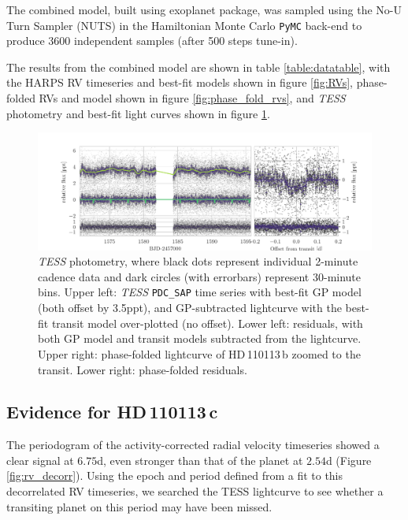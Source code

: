 \documentclass[fleqn,usenatbib]{mnras}
\newcommand{\tess}{{\it TESS}}
\newcommand{\harps}{{HARPS}}
\newcommand{\Tplanet}{HD\,110113\,b}
\newcommand{\Tplanetc}{HD\,110113\,c}
\begin{document}
The combined model, built using \textsf{exoplanet} \citep{exoplanet} package, was sampled using the No-U Turn Sampler (NUTS) in the Hamiltonian Monte Carlo \texttt{PyMC} back-end \citep{exoplanet:pymc3} to produce 3600 independent samples (after 500 steps tune-in).

The results from the combined model are shown in table \ref{table:datatable}, with the \harps{} RV timeseries and best-fit models shown in figure \ref{fig:RVs}, phase-folded RVs and model shown in figure \ref{fig:phase_fold_rvs}, and \tess{} photometry and best-fit light curves shown in figure \ref{fig:photometry}.

\begin{figure}
	\includegraphics[width=\textwidth, trim={1.45cm 0.2 0.95cm 0.5}]{Combined_phot_plot_3_GPs}
    \caption{\tess{} photometry, where black dots represent individual 2-minute cadence data and dark circles (with errorbars) represent 30-minute bins. Upper left: \tess{} \texttt{PDC\_SAP} time series with best-fit GP model (both offset by 3.5ppt), and GP-subtracted lightcurve with the best-fit transit model over-plotted (no offset). Lower left: residuals, with both GP model and transit models subtracted from the lightcurve. Upper right: phase-folded lightcurve of \Tplanet{} zoomed to the transit. Lower right: phase-folded residuals. }
    \label{fig:photometry}
\end{figure}

\subsection{Evidence for \Tplanetc{}}
The periodogram of the activity-corrected radial velocity timeseries showed a clear signal at $6.75$d, even stronger than that of the planet at $2.54$d (Figure \ref{fig:rv_decorr}).
Using the epoch and period defined from a fit to this decorrelated RV timeseries, we searched the TESS lightcurve to see whether a transiting planet on this period may have been missed.
\end{document}
